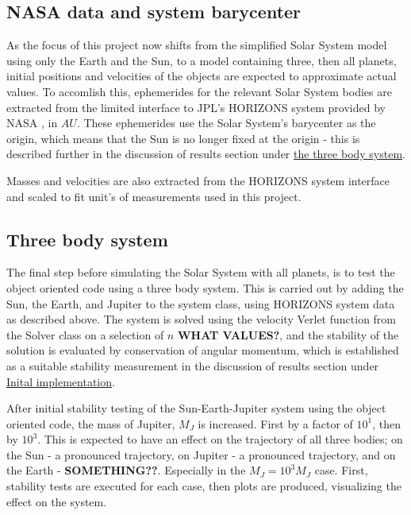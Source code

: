 \documentclass[%
oneside,                 %
final,                   %
10pt]{article}
\begin{document}
\subsection{NASA data and system barycenter}
As the focus of this project now shifts from the simplified Solar System model using only the Earth and the Sun, to a model containing three, then all planets, initial positions and velocities of the objects are expected to approximate actual values. To accomlish this, ephemerides for the relevant Solar System bodies are extracted from the limited interface to JPL's HORIZONS system provided by NASA \cite{nasadata}, in $AU$. These ephemerides use the Solar System's barycenter as the origin, which means that the Sun is no longer fixed at the origin - this is described further in the discussion of results section under  \hyperref[subsec:Discofres:3B]{the three body system}.  \newline

Masses and velocities are also extracted from the HORIZONS system interface and scaled to fit unit's of measurements used in this project.

\subsection{Three body system}
\label{sec:Modmultibody}
The final step before simulating the Solar System with all planets, is to test the object oriented code using a three body system. This is carried out by adding the Sun, the Earth, and Jupiter to the system class, using HORIZONS system data as described above. The system is solved using the velocity Verlet function from the Solver class on a selection of $n$ \textbf{WHAT VALUES?}, and the stability of the solution is evaluated by conservation of angular momentum, which is established as a suitable stability measurement in the discussion of results section under \hyperref[subsec:Discofres:initimpl]{Inital implementation}. \newline

After initial stability testing of the Sun-Earth-Jupiter system using the object oriented code, the mass of Jupiter, $M_J$ is increased. First by a factor of $10^1$, then by $10^3$. This is expected to have an effect on the trajectory of all three bodies; on the Sun - a pronounced trajectory, on Jupiter - a pronounced trajectory, and on the Earth - \textbf{SOMETHING??}. Especially in the $M_J=10^3 M_J$ case. First, stability tests are executed for each case, then plots are produced, visualizing the effect on the system.
  
\end{document}
